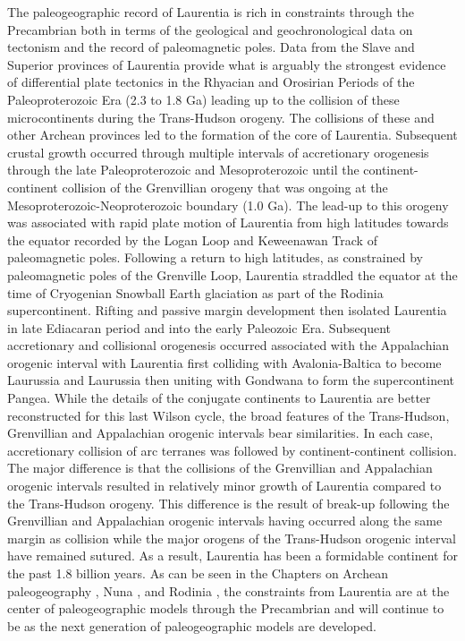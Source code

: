 \documentclass[twocolumn, switch]{article} %
\begin{document}
The paleogeographic record of Laurentia is rich in constraints through the Precambrian both in terms of the geological and geochronological data on tectonism and the record of paleomagnetic poles. Data from the Slave and Superior provinces of Laurentia provide what is arguably the strongest evidence of differential plate tectonics in the Rhyacian and Orosirian Periods of the Paleoproterozoic Era (2.3 to 1.8 Ga) leading up to the collision of these microcontinents during the Trans-Hudson orogeny. The collisions of these and other Archean provinces led to the formation of the core of Laurentia. Subsequent crustal growth occurred through multiple intervals of accretionary orogenesis through the late Paleoproterozoic and Mesoproterozoic until the continent-continent collision of the Grenvillian orogeny that was ongoing at the Mesoproterozoic-Neoproterozoic boundary (1.0 Ga). The lead-up to this orogeny was associated with rapid plate motion of Laurentia from high latitudes towards the equator recorded by the Logan Loop and Keweenawan Track of paleomagnetic poles. Following a return to high latitudes, as constrained by paleomagnetic poles of the Grenville Loop, Laurentia straddled the equator at the time of Cryogenian Snowball Earth glaciation as part of the Rodinia supercontinent. Rifting and passive margin development then isolated Laurentia in late Ediacaran period and into the early Paleozoic Era. Subsequent accretionary and collisional orogenesis occurred associated with the Appalachian orogenic interval with Laurentia first colliding with Avalonia-Baltica to become Laurussia and Laurussia then uniting with Gondwana to form the supercontinent Pangea. While the details of the conjugate continents to Laurentia are better reconstructed for this last Wilson cycle, the broad features of the Trans-Hudson, Grenvillian and Appalachian orogenic intervals bear similarities. In each case, accretionary collision of arc terranes was followed by continent-continent collision. The major difference is that the collisions of the Grenvillian and Appalachian orogenic intervals resulted in relatively minor growth of Laurentia compared to the Trans-Hudson orogeny. This difference is the result of break-up following the Grenvillian and Appalachian orogenic intervals having occurred along the same margin as collision while the major orogens of the Trans-Hudson orogenic interval have remained sutured. As a result, Laurentia has been a formidable continent for the past 1.8 billion years. As can be seen in the Chapters on Archean paleogeography \citep{Salminen2021b}, Nuna \citep{Elming2021a}, and Rodinia \citep{Evans2021b}, the constraints from Laurentia are at the center of paleogeographic models through the Precambrian and will continue to be as the next generation of paleogeographic models are developed.
\end{document}
